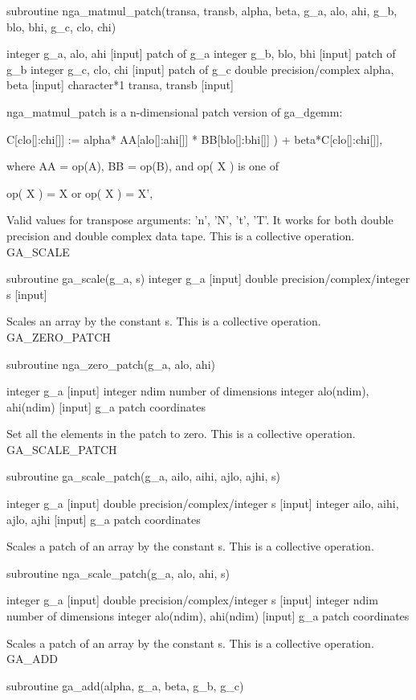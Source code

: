 subroutine nga\_matmul\_patch(transa, transb, alpha, beta, g\_a, alo,
ahi, g\_b, blo, bhi, g\_c, clo, chi)

integer g\_a, alo, ahi {[}input{]} patch of g\_a integer g\_b, blo,
bhi {[}input{]} patch of g\_b integer g\_c, clo, chi {[}input{]} patch
of g\_c double precision/complex alpha, beta {[}input{]} character{*}1
transa, transb {[}input{]}

nga\_matmul\_patch is a n-dimensional patch version of ga\_dgemm:

C{[}clo{[}{]}:chi{[}{]}{]} := alpha{*} AA{[}alo{[}{]}:ahi{[}{]}{]}
{*} BB{[}blo{[}{]}:bhi{[}{]}{]} ) + beta{*}C{[}clo{[}{]}:chi{[}{]}{]},

where AA = op(A), BB = op(B), and op( X ) is one of

op( X ) = X or op( X ) = X',

Valid values for transpose arguments: 'n', 'N', 't', 'T'. It works
for both double precision and double complex data tape. This is a
collective operation. GA\_SCALE

subroutine ga\_scale(g\_a, s) integer g\_a {[}input{]} double precision/complex/integer
s {[}input{]}

Scales an array by the constant s. This is a collective operation.
GA\_ZERO\_PATCH

subroutine nga\_zero\_patch(g\_a, alo, ahi)

integer g\_a {[}input{]} integer ndim number of dimensions integer
alo(ndim), ahi(ndim) {[}input{]} g\_a patch coordinates

Set all the elements in the patch to zero. This is a collective operation.
GA\_SCALE\_PATCH

subroutine ga\_scale\_patch(g\_a, ailo, aihi, ajlo, ajhi, s)

integer g\_a {[}input{]} double precision/complex/integer s {[}input{]}
integer ailo, aihi, ajlo, ajhi {[}input{]} g\_a patch coordinates

Scales a patch of an array by the constant s. This is a collective
operation.

subroutine nga\_scale\_patch(g\_a, alo, ahi, s)

integer g\_a {[}input{]} double precision/complex/integer s {[}input{]}
integer ndim number of dimensions integer alo(ndim), ahi(ndim) {[}input{]}
g\_a patch coordinates

Scales a patch of an array by the constant s. This is a collective
operation. GA\_ADD

subroutine ga\_add(alpha, g\_a, beta, g\_b, g\_c)

